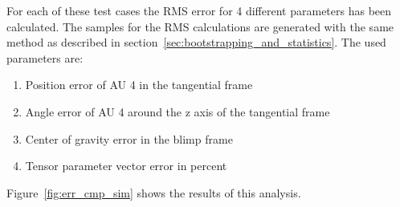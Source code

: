 For each of these test cases the RMS error for 4 different parameters has been calculated.
The samples for the RMS calculations are generated with the same method as described in section~\ref{sec:bootstrapping_and_statistics}.
The used parameters are:
\begin{enumerate}
\item Position error of AU 4 in the tangential frame
\item Angle error of AU 4 around the z axis of the tangential frame
\item Center of gravity error in the blimp frame
\item Tensor parameter vector error in percent
\end{enumerate}

Figure~\ref{fig:err_cmp_sim} shows the results of this analysis.

